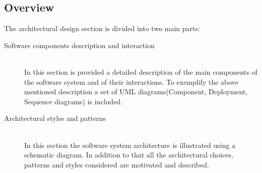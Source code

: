 \documentclass[11pt,titlepage]{article} %
\begin{document}
\subsection{Overview}
         The architectural design section is divided into two main parts:
	\begin{description}
	        \item [Software components description and interaction] \hfill \\
	            In this section is provided a detailed description of the main components of the software system
	            and of their interactions.
	            To exemplify the above mentioned description a set of UML diagrams(Component, Deployment, Sequence diagrams) is
	            included.
	        \item [Architectural styles and patterns] \hfill \\
	            In this section the software system architecture is illustrated using a schematic diagram.
	            In addition to that all the architectural choices, patterns and styles considered are motivated and described.
	\end{description}
\end{document}
